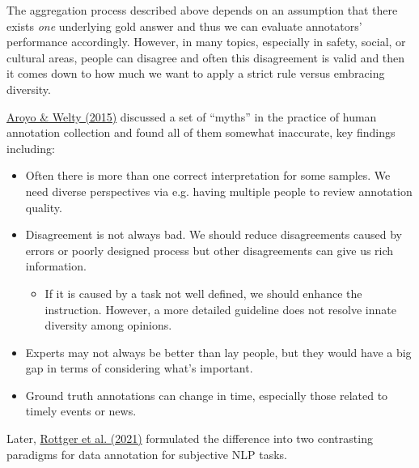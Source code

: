 The aggregation process described above depends on an assumption that there exists \emph{one} underlying gold answer and thus we can evaluate annotators' performance accordingly. However, in many topics, especially in safety, social, or cultural areas, people can disagree and often this disagreement is valid and then it comes down to how much we want to apply a strict rule versus embracing diversity.

\href{https://ojs.aaai.org/aimagazine/index.php/aimagazine/article/view/2564}{Aroyo \& Welty (2015)} discussed a set of ``myths'' in the practice of human annotation collection and found all of them somewhat inaccurate, key findings including:

\begin{itemize}
\tightlist
\item
  Often there is more than one correct interpretation for some samples. We need diverse perspectives via e.g. having multiple people to review annotation quality.
\item
  Disagreement is not always bad. We should reduce disagreements caused by errors or poorly designed process but other disagreements can give us rich information.

  \begin{itemize}
  \tightlist
  \item
    If it is caused by a task not well defined, we should enhance the instruction. However, a more detailed guideline does not resolve innate diversity among opinions.
  \end{itemize}
\item
  Experts may not always be better than lay people, but they would have a big gap in terms of considering what's important.
\item
  Ground truth annotations can change in time, especially those related to timely events or news.
\end{itemize}

Later, \href{https://arxiv.org/abs/2112.07475}{Rottger et al. (2021)} formulated the difference into two contrasting paradigms for data annotation for subjective NLP tasks.


